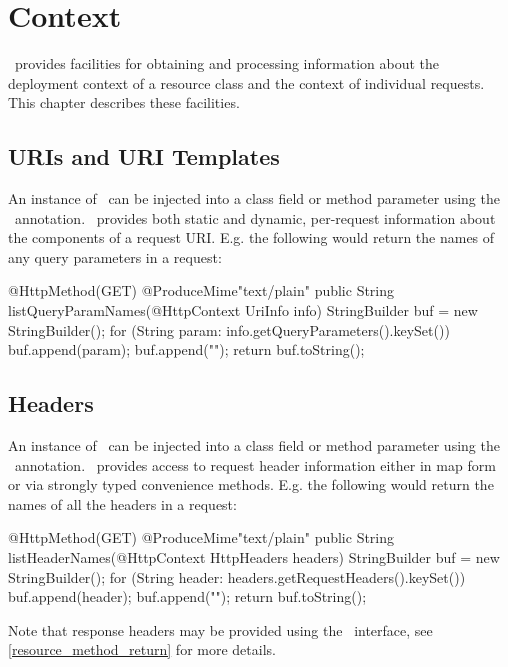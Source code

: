 \chapter{Context}
\label{context}

\jaxrs\ provides facilities for obtaining and processing information about the deployment context of a resource class and the context of individual requests. This chapter describes these facilities.

\section{URIs and URI Templates}

An instance of \UriInfo\ can be injected into a class field or method parameter using the \HttpContext\ annotation. \UriInfo\ provides both static and dynamic, per-request information about the components of a request URI. E.g. the following would return the names of any query parameters in a request:

\begin{listing}{1}
@HttpMethod(GET)
@ProduceMime{"text/plain"}
public String listQueryParamNames(@HttpContext UriInfo info) {
  StringBuilder buf = new StringBuilder();
  for (String param: info.getQueryParameters().keySet()) {
    buf.append(param);
    buf.append("\n");
  }
  return buf.toString();
}
\end{listing} 

\section{Headers}

An instance of \HttpHeaders\ can be injected into a class field or method parameter using the \HttpContext\ annotation. \HttpHeaders\ provides access to request header information either in map form or via strongly typed convenience methods. E.g. the following would return the names of all the headers in a request:

\begin{listing}{1}
@HttpMethod(GET)
@ProduceMime{"text/plain"}
public String listHeaderNames(@HttpContext HttpHeaders headers) {
  StringBuilder buf = new StringBuilder();
  for (String header: headers.getRequestHeaders().keySet()) {
    buf.append(header);
    buf.append("\n");
  }
  return buf.toString();
}
\end{listing}

Note that response headers may be provided using the \Response\ interface, see \ref{resource_method_return} for more details.

